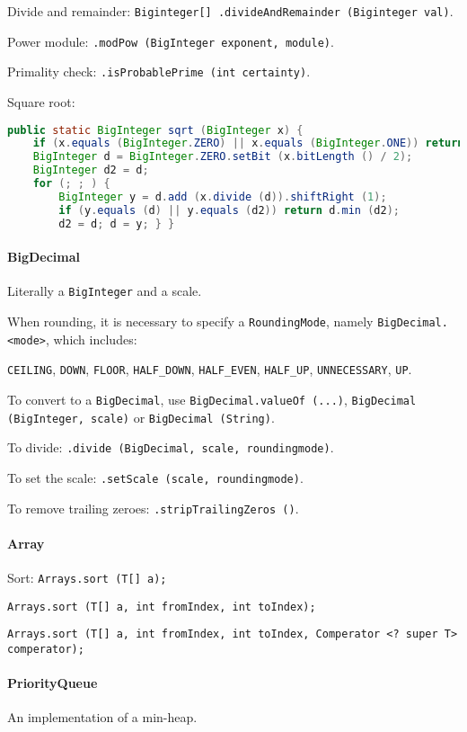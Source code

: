 Divide and remainder: \texttt{Biginteger[] .divideAndRemainder (Biginteger val)}.

Power module: \texttt{.modPow (BigInteger exponent, module)}.

Primality check: \texttt{.isProbablePrime (int certainty)}.

Square root:
\begin{lstlisting}[language=java]
public static BigInteger sqrt (BigInteger x) {
	if (x.equals (BigInteger.ZERO) || x.equals (BigInteger.ONE)) return x;
	BigInteger d = BigInteger.ZERO.setBit (x.bitLength () / 2);
	BigInteger d2 = d;
	for (; ; ) {
		BigInteger y = d.add (x.divide (d)).shiftRight (1);
		if (y.equals (d) || y.equals (d2)) return d.min (d2);
		d2 = d; d = y; } }
\end{lstlisting}

\paragraph{BigDecimal}
Literally a \texttt{BigInteger} and a scale.

When rounding, it is necessary to specify a \texttt{RoundingMode}, namely \texttt{BigDecimal.<mode>}, which includes: 

\texttt{CEILING}, \texttt{DOWN}, \texttt{FLOOR}, \texttt{HALF\_DOWN}, \texttt{HALF\_EVEN}, \texttt{HALF\_UP}, \texttt{UNNECESSARY}, \texttt{UP}.

To convert to a \texttt{BigDecimal}, use \texttt{BigDecimal.valueOf (...)}, \texttt{BigDecimal (BigInteger, scale)} or \texttt{BigDecimal (String)}.

To divide: \texttt{.divide (BigDecimal, scale, roundingmode)}.

To set the scale: \texttt{.setScale (scale, roundingmode)}.

To remove trailing zeroes: \texttt{.stripTrailingZeros ()}.

\paragraph{Array}
Sort: \texttt{Arrays.sort (T[] a);}

\texttt{Arrays.sort (T[] a, int fromIndex, int toIndex);}

\texttt{Arrays.sort (T[] a, int fromIndex, int toIndex, Comperator <? super T> comperator);}

\paragraph{PriorityQueue}
An implementation of a min-heap.

